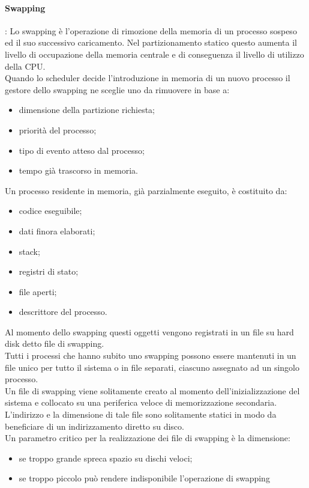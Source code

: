 \documentclass[12pt, letterpaper]{report}
\begin{document}
	\paragraph{Swapping}:
	Lo swapping è l'operazione di rimozione della memoria di un processo sospeso ed il suo successivo caricamento. Nel partizionamento statico questo aumenta il livello di occupazione della memoria centrale e di conseguenza il livello di utilizzo della CPU.	\\
	Quando lo scheduler decide l'introduzione in memoria di un nuovo processo il gestore dello swapping ne sceglie uno da rimuovere in base a:
	\begin{itemize}
		\item dimensione della partizione richiesta;
		\item priorità del processo;
		\item tipo di evento atteso dal processo;
		\item tempo già trascorso in memoria.
	\end{itemize}
	Un processo residente in memoria, già parzialmente eseguito, è costituito da:
	\begin{itemize}
		\item codice eseguibile;
		\item dati finora elaborati;
		\item stack;
		\item registri di stato;
		\item file aperti;
		\item descrittore del processo.
	\end{itemize}
	Al momento dello swapping questi oggetti vengono registrati in un file su hard disk detto file di swapping. \\
	Tutti i processi che hanno subito uno swapping possono essere mantenuti in un file unico per tutto il sistema o in file separati, ciascuno assegnato ad un singolo processo. \\
	Un file di swapping viene solitamente creato al momento dell'inizializzazione del sistema e collocato su una periferica veloce di memorizzazione secondaria. L'indirizzo e la dimensione di tale file sono solitamente statici in modo da beneficiare di un indirizzamento diretto su disco. \\
	Un parametro critico per la realizzazione dei file di swapping è la dimensione:
	\begin{itemize}
		\item se troppo grande spreca spazio su dischi veloci;
		\item se troppo piccolo può rendere indisponibile l'operazione di swapping
	\end{itemize}
\end{document}
